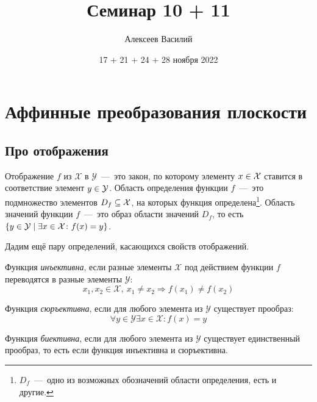 \documentclass[a4paper,12pt]{article}
\author{Алексеев Василий}
\title{Семинар 10 + 11}
\date{17 + 21 + 24 + 28 ноября 2022}
\begin{document}
  \maketitle
  
  \tableofcontents

  \thispagestyle{empty}
  
  \newpage
  


  \section{Аффинные преобразования плоскости}
  
  \subsection{Про отображения}
  
  Отображение $f$ из $\mathcal X$ в $\mathcal Y$~---~это закон, по которому элементу $x \hm\in \mathcal X$ ставится в соответствие элемент $y \hm\in \mathcal Y$.
  Область определения функции $f$~---~это подмножество элементов $D_f \hm\subseteq \mathcal X$, на которых функция определена\footnote{$D_f$~---~одно из возможных обозначений области определения, есть и другие.}.
  Область значений функции $f$~---~это образ области значений $D_f$, то есть $\{y \hm\in \mathcal Y \hm\mid \exists x \hm\in \mathcal X\colon f(x) \hm= y\}$.
  
  Дадим ещё пару определений, касающихся свойств отображений.
  
  \begin{definition}[Инъекция]
    Функция \emph{инъективна}, если разные элементы $\mathcal X$ под действием функции $f$ переводятся в разные элементы $\mathcal Y$:
    \[
      x_1, x_2 \in \mathcal X,\ x_1 \not= x_2 \Rightarrow f(x_1) \not= f(x_2)
    \]
  \end{definition}
  
  \begin{definition}[Сюръекция]
    Функция \emph{сюръективна}, если для любого элемента из $\mathcal Y$ существует прообраз:
    \[
      \forall y \in \mathcal Y \exists x \in \mathcal X\colon f(x) = y
    \]
  \end{definition}
  
  \begin{definition}[Биекция]
    Функция \emph{биективна}, если для любого элемента из $\mathcal Y$ существует единственный прообраз, то есть если функция инъективна и сюръективна.
  \end{definition}
  
\end{document}
